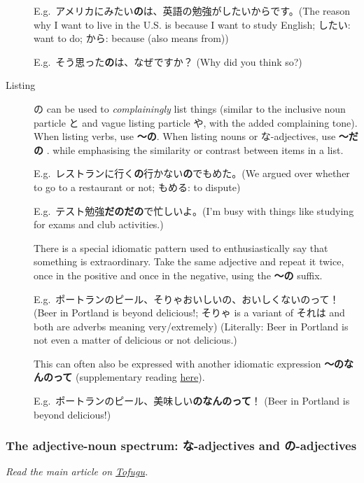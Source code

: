\documentclass[../nihongo-gakushuu-kyouzai.tex]{subfiles}
\begin{document}
\begin{description}
    E.g.\ アメリカにみたい\textbf{の}は、英語の勉強がしたいからです。(The reason why I want to live in the U.S. is because I want to study English; したい: want to do; から: because (also means from))

    E.g.\ そう思った\textbf{の}は、なぜですか？ (Why did you think so?)

    \item[Listing] の can be used to \emph{complainingly} list things (similar to the inclusive noun particle と and vague listing particle や, with the added complaining tone). When listing verbs, use \textbf{〜の}. When listing nouns or な-adjectives, use \textbf{〜だの} .  while emphasising the similarity or contrast between items in a list.

    E.g.\ レストランに行く\textbf{の}行かない\textbf{の}でもめた。(We argued over whether to go to a restaurant or not; もめる: to dispute)

    E.g.\ テスト勉強\textbf{だの}\textbf{だの}で忙しいよ。(I'm busy with things like studying for exams and club activities.)

    There is a special idiomatic pattern used to enthusiastically say that something is extraordinary. Take the same adjective and repeat it twice, once in the positive and once in the negative, using the \textbf{〜の} suffix.

    E.g.\ ポートランのピール、そりゃおいしいの、おいしくないのって！ (Beer in Portland is beyond delicious!; そりゃ is a variant of それは and both are adverbs meaning very/extremely) (Literally: Beer in Portland is not even a matter of delicious or not delicious.)

    This can often also be expressed with another idiomatic expression \textbf{〜のなんのって} (supplementary reading \href{https://bunpro.jp/grammar_points/%E3%81%AE%E3%81%AA%E3%82%93%E3%81%AE%E3%81%A3%E3%81%A6}{here}).

    E.g.\ ポートランのピール、美味しい\textbf{のなんのって}！ (Beer in Portland is beyond delicious!)
\end{description}


\subsubsection{The adjective-noun spectrum: な-adjectives and の-adjectives} \label{sec:no-adjectives}
\emph{Read the main article on \href{https://www.tofugu.com/japanese/na-adjectives-no-adjectives/}{Tofugu}.}
\end{document}
